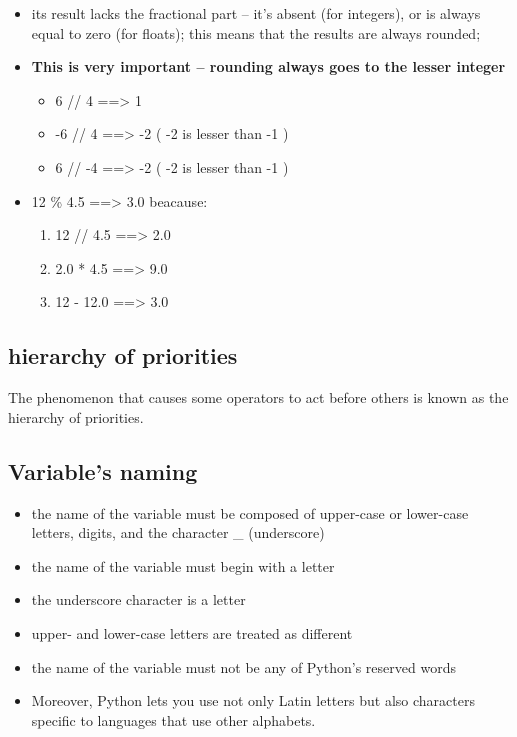 \documentclass[11pt]{article}
\begin{document}
\begin{itemize}
\item its result lacks the fractional part – it’s absent (for integers),
or is always equal to zero (for floats); this means that the
results are always rounded;

\item \textbf{This is very important – rounding always goes to the lesser
integer}
\begin{itemize}
\item 6 // 4 ==> 1
\item -6 // 4 ==> -2 ( -2 is lesser than -1 )
\item 6 // -4 ==> -2 ( -2 is lesser than -1 )
\end{itemize}

\item 12 \% 4.5 ==> 3.0 beacause:
\begin{enumerate}
\item 12 // 4.5 ==> 2.0
\item 2.0 * 4.5 ==> 9.0
\item 12 - 12.0 ==> 3.0
\end{enumerate}
\end{itemize}

\subsection{hierarchy of priorities}
\label{sec:org693890c}
The phenomenon that causes some operators to act before others is
known as the hierarchy of priorities.
\subsection{Variable's naming}
\label{sec:org386d686}
\begin{itemize}
\item the name of the variable must be composed of upper-case or
lower-case letters, digits, and the character \_ (underscore)
\item the name of the variable must begin with a letter
\item the underscore character is a letter
\item upper- and lower-case letters are treated as different
\item the name of the variable must not be any of Python’s reserved words
\item Moreover, Python lets you use not only Latin letters but also
characters specific to languages that use other alphabets.
\end{itemize}
\end{document}
